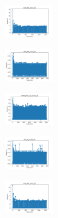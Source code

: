 \begin{figure}[H]
    \begin{subfigure}
        \centering
        \includegraphics[width=0.234\textwidth]{img/am01/ecoli_set_const_20_589741062_time.png}
    \end{subfigure}
    \hfill
    \begin{subfigure}
        \centering
        \includegraphics[width=0.234\textwidth]{img/am01/rand_set_const_20_589741062_time.png}
    \end{subfigure}
    \hfill
    \begin{subfigure}
        \centering
        \includegraphics[width=0.234\textwidth]{img/am01/newthyroid_set_const_20_589741062_time.png}
    \end{subfigure}
    \hfill
    \begin{subfigure}
        \centering
        \includegraphics[width=0.234\textwidth]{img/am01/iris_set_const_20_277451237_time.png}
    \end{subfigure}
    \hfill
    \begin{subfigure}
        \centering
        \includegraphics[width=0.234\textwidth]{img/am01/ecoli_set_const_20_277451237_time.png}
    \end{subfigure}
    \hfill
    \begin{subfigure}
        \centering

\end{subfigure}
\end{figure}
